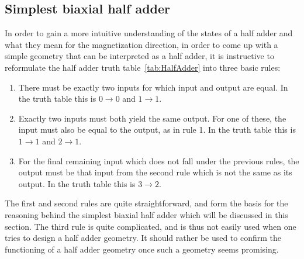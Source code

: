 \documentclass[11pt,a4paper,english]{article}
\begin{document}
\subsection{Simplest biaxial half adder}
In order to gain a more intuitive understanding of the states of a half adder and what they mean for the magnetization direction, in order to come up with a simple geometry that can be interpreted as a half adder, it is instructive to reformulate the half adder truth table~\ref{tab:HalfAdder} into three basic rules:
\begin{enumerate}
    \item There must be exactly two inputs for which input and output are equal. In the truth table this is $0\rightarrow0$ and $1\rightarrow1$.
    \item Exactly two inputs must both yield the same output. For one of these, the input must also be equal to the output, as in rule 1. In the truth table this is $1\rightarrow1$ and $2\rightarrow1$.
    \item For the final remaining input which does not fall under the previous rules, the output must be that input from the second rule which is not the same as its output. In the truth table this is $3\rightarrow2$.
\end{enumerate}
The first and second rules are quite straightforward, and form the basis for the reasoning behind the simplest biaxial half adder which will be discussed in this section. The third rule is quite complicated, and is thus not easily used when one tries to design a half adder geometry. It should rather be used to confirm the functioning of a half adder geometry once such a geometry seems promising.
\end{document}
